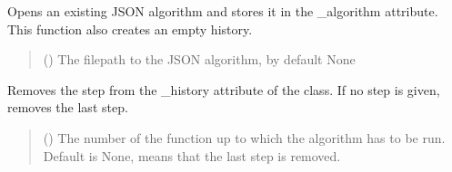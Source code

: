 \documentclass[letterpaper,10pt,english]{sphinxmanual}
\begin{document}
\begin{fulllineitems}

\begin{fulllineitems}
\label{\detokenize{source/_autosummary/HDF5_BLS_treat.Treat_backend:HDF5_BLS_treat.Treat_backend.silent_open_algorithm}}
\pysigstartsignatures
\pysiglinewithargsret
{}
{}
{}
\pysigstopsignatures
\sphinxAtStartPar
Opens an existing JSON algorithm and stores it in the \_algorithm attribute. This function also creates an empty history.
\begin{quote}\begin{description}
\sphinxAtStartPar
{} (\sphinxstyleliteralemphasis{\sphinxupquote{, }}) \textendash{} The filepath to the JSON algorithm, by default None

\end{description}\end{quote}

\end{fulllineitems}


\begin{fulllineitems}
\label{\detokenize{source/_autosummary/HDF5_BLS_treat.Treat_backend:HDF5_BLS_treat.Treat_backend.silent_remove_step}}
\pysigstartsignatures
\pysiglinewithargsret
{}
{}
{}
\pysigstopsignatures
\sphinxAtStartPar
Removes the step from the \_history attribute of the class. If no step is given, removes the last step.
\begin{quote}\begin{description}
\sphinxAtStartPar
{} (\sphinxstyleliteralemphasis{\sphinxupquote{, }}) \textendash{} The number of the function up to which the algorithm has to be run. Default is None, means that the last step is removed.


\end{description}
\end{quote}
\end{fulllineitems}
\end{fulllineitems}
\end{document}
